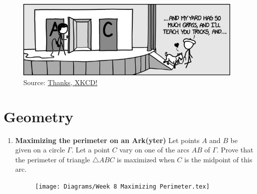 \documentclass[11pt]{scrartcl}
\begin{document}
\begin{enumerate}[label=\textbf{C\arabic*}.]
    \begin{figure}[h]
        \centering
        \includegraphics[width = 11cm]{Diagrams/Monty Hall.png}
        \caption{Source: \href{https://xkcd.com/1282/}{Thanks, XKCD!}}
        \label{fig:Monty_Hall}
    \end{figure}
    
\end{enumerate}

\newpage
\section{Geometry}
\begin{enumerate}[label=\textbf{G\arabic*}.]
  \item \textbf{Maximizing the perimeter on an Ark(yter)} \newline
  Let points $A$ and $B$ be given on a circle $\Gamma$. Let a point $C$ vary on one of the arcs $AB$ of $\Gamma$. Prove that the perimeter of triangle $\triangle ABC$ is maximized when $C$ is the midpoint of this arc.
  
    \begin{figure}[h]
        \centering
        \texttt{[image: Diagrams/Week 8 Maximizing Perimeter.tex]}
    \end{figure}
\end{enumerate}

\newpage
\end{document}
